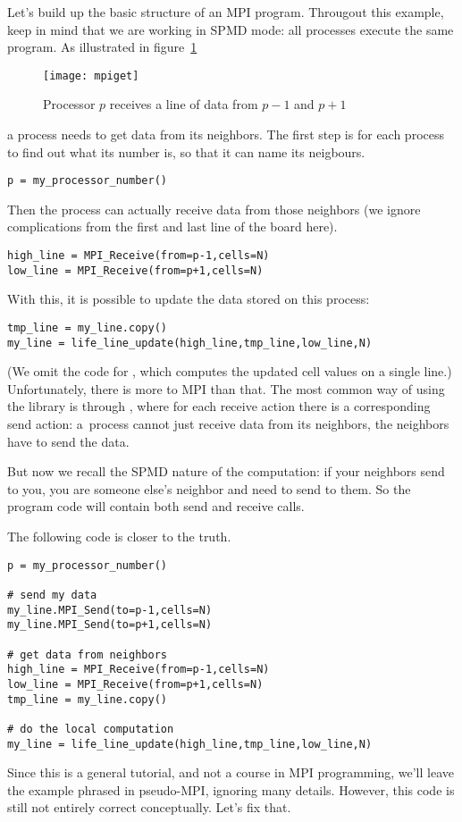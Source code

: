 Let's build up the basic structure of an MPI program. 
Througout this example, keep in mind that we are working in \ac{SPMD} mode:
all processes execute the same program.
As illustrated in figure~\ref{fig:mpiget}
\begin{figure}[t]
  \texttt{[image: mpiget]}
  \caption{Processor $p$ receives a line of data from $p-1$ and $p+1$}
  \label{fig:mpiget}
\end{figure}
a process needs to get data from its neighbors. 
The first step is for each process to find out what its number is,
so that it can name its neigbours.
\begin{verbatim}
p = my_processor_number()
\end{verbatim}
Then the process can actually receive data from those neighbors
(we ignore complications from the first and last line of the board here).
\begin{verbatim}
high_line = MPI_Receive(from=p-1,cells=N)
low_line = MPI_Receive(from=p+1,cells=N)
\end{verbatim}
With this, it is possible to update the data stored on this process:
\begin{verbatim}
tmp_line = my_line.copy()
my_line = life_line_update(high_line,tmp_line,low_line,N)
\end{verbatim}
(We omit the code for , which computes the updated
cell values on a single line.)
Unfortunately, there is more to MPI than that. The most common way
of using the library is through ,
where for each receive action there is a corresponding send action:
a~process cannot just receive data from its neighbors, the neighbors
have to send the data.

But now we recall the \ac{SPMD} nature of the computation: 
if your neighbors send to you, you are someone else's neighbor and
need to send to them. So the program code will contain both
send and receive calls.

The following code is closer to the truth.
\begin{verbatim}
p = my_processor_number()

# send my data
my_line.MPI_Send(to=p-1,cells=N)
my_line.MPI_Send(to=p+1,cells=N)

# get data from neighbors
high_line = MPI_Receive(from=p-1,cells=N)
low_line = MPI_Receive(from=p+1,cells=N)
tmp_line = my_line.copy()

# do the local computation
my_line = life_line_update(high_line,tmp_line,low_line,N)
\end{verbatim}
Since this is a general tutorial, and not a course in MPI programming,
we'll leave the example phrased in pseudo-MPI, ignoring many details.
However, this code is still not entirely
correct conceptually. Let's fix that.

